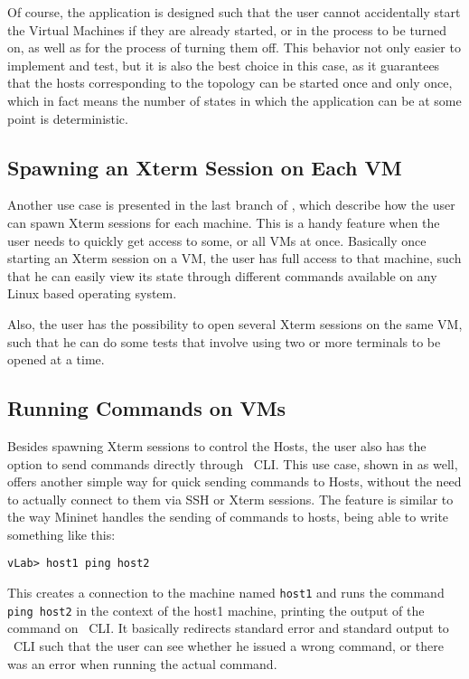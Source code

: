 Of course, the application is designed such that the user cannot accidentally start the Virtual Machines if they are already started, or in the process to be turned on, as well as for the process of turning them off.
This behavior not only easier to implement and test, but it is also the best choice in this case, as it guarantees that the hosts corresponding to the topology can be started once and only once, which in fact means the number of states in which the application can be at some point is deterministic.

\subsection{Spawning an Xterm Session on Each VM}
\label{sub-sec:spawn-xterm}

Another use case is presented in the last branch of  , which describe how the user can spawn Xterm sessions for each machine.
This is a handy feature when the user needs to quickly get access to some, or all VMs at once.
Basically once starting an Xterm session on a VM, the user has full access to that machine, such that he can easily view its state through different commands available on any Linux based operating system.

Also, the user has the possibility to open several Xterm sessions on the same VM, such that he can do some tests that involve using two or more terminals to be opened at a time.

\subsection{Running Commands on VMs}
\label{sub-sec:run-cmd}

Besides spawning Xterm sessions to control the Hosts, the user also has the option to send commands directly through \project\ CLI.
This use case, shown in  as well, offers another simple way for quick sending commands to Hosts, without the need to actually connect to them via SSH or Xterm sessions.
The feature is similar to the way Mininet handles the sending of commands to hosts, being able to write something like this:

\lstset{label=lst:ping-example}
\begin{lstlisting}
vLab> host1 ping host2
\end{lstlisting}

This creates a connection to the machine named \texttt{host1} and runs the command \texttt{ping host2} in the context of the host1 machine, printing the output of the command on \project\ CLI.
It basically redirects standard error and standard output to \project\ CLI such that the user can see whether he issued a wrong command, or there was an error when running the actual command.

